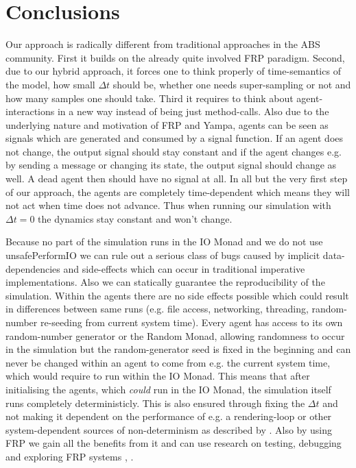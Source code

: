 \section{Conclusions}
\label{sec:conclusions}

Our approach is radically different from traditional approaches in the ABS community. First it builds on the already quite involved FRP paradigm. Second, due to our hybrid approach, it forces one to think properly of time-semantics of the model, how small $\Delta t$ should be, whether one needs super-sampling or not and how many samples one should take. Third it requires to think about agent-interactions in a new way instead of being just method-calls. Also due to the underlying nature and motivation of FRP and Yampa, agents can be seen as signals which are generated and consumed by a signal function. If an agent does not change, the output signal should stay constant and if the agent changes e.g. by sending a message or changing its state, the output signal should change as well. A dead agent then should have no signal at all. In all but the very first step of our approach, the agents are completely time-dependent which means they will not act when time does not advance. Thus when running our simulation with $\Delta t = 0$ the dynamics stay constant and won't change.

Because no part of the simulation runs in the IO Monad and we do not use unsafePerformIO we can rule out a serious class of bugs caused by implicit data-dependencies and side-effects which can occur in traditional imperative implementations. Also we can statically guarantee the reproducibility of the simulation. Within the agents there are no side effects possible which could result in differences between same runs (e.g. file access, networking, threading, random-number re-seeding from current system time). Every agent has access to its own random-number generator or the Random Monad, allowing randomness to occur in the simulation but the random-generator seed is fixed in the beginning and can never be changed within an agent to come from e.g. the current system time, which would require to run within the IO Monad. This means that after initialising the agents, which \textit{could} run in the IO Monad, the simulation itself runs completely deterministicly. This is also ensured through fixing the $\Delta t$ and not making it dependent on the performance of e.g. a rendering-loop or other system-dependent sources of non-determinism as described by \cite{perez_testing_2017}. Also by using FRP we gain all the benefits from it and can use research on testing, debugging and exploring FRP systems \cite{perez_testing_2017}, \cite{perez_back_2017}.


